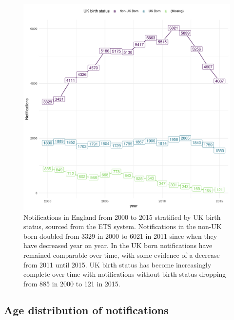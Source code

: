 \documentclass[11pt,twoside]{bristolthesis}
\begin{document}
  \begin{figure}
  
  {\centering \includegraphics[width=0.8\linewidth,]{chapters/tb-epi-england/figures/plot-overall-nots} 
  
  }
  
  \caption[Notifications in England from 2000 to 2015 stratified by UK birth status, sourced from the ETS system.]{Notifications in England from 2000 to 2015 stratified by UK birth status, sourced from the ETS system. Notifications in the non-UK born doubled from 3329 in 2000 to 6021 in 2011 since when they have decreased year on year. In the UK born notifications have remained comparable over time, with some evidence of a decrease from 2011 until 2015. UK birth status has become increasingly complete over time with notifications without birth status dropping from 885 in 2000 to 121 in 2015.}\label{fig:plot-overall-nots}
  \end{figure}
  \hypertarget{age-dist-nots}{%
  \subsection{Age distribution of notifications}\label{age-dist-nots}}
  
\end{document}
